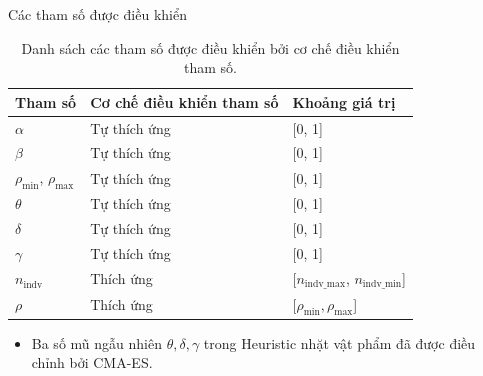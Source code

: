\documentclass[aspectratio=169]{beamer}
\begin{document}
\begin{frame}{Các tham số được điều khiển}
    \vspace{-0.5cm}
    \begin{table}
        \small
        \caption{Danh sách các tham số được điều khiển bởi cơ chế điều khiển tham số.}
        \label{tab:control_param}
        \begin{tabular}{l|l|l}
            \hline
            Tham số                                & Cơ chế điều khiển tham số & Khoảng giá trị                                            \\
            \hline
            $\alpha$                                 & Tự thích ứng               & [0, 1]                                           \\
            $\beta$                                  & Tự thích ứng               & [0, 1]                                           \\
            $\rho_{\text{min}}$, $\rho_{\text{max}}$ & Tự thích ứng               & [0, 1]                                           \\
            $\theta$                                 & Tự thích ứng               & [0, 1]                                           \\
            $\delta$                                 & Tự thích ứng               & [0, 1]                                           \\
            $\gamma$                                 & Tự thích ứng               & [0, 1]                                           \\
            $n_{\text{indv}}$                        & Thích ứng                    & [$n_{\text{indv\_max}}$, $n_{\text{indv\_min}}$] \\
            $\rho$                                   & Thích ứng                    & [$\rho_{\text{min}}, \rho_\text{{max}}$]         \\
            \hline
        \end{tabular}
    \end{table}

    \vspace{0.2cm}
    \begin{itemize}
        \item Ba số mũ ngẫu nhiên $\theta, \delta, \gamma$ trong Heuristic nhặt vật phẩm đã được điều chỉnh bởi CMA-ES.
    \end{itemize}
\end{frame}
\end{document}
